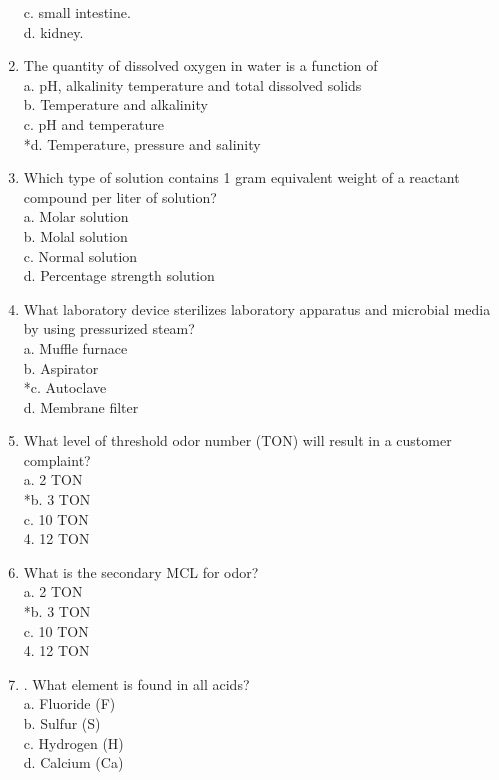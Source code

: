 \begin{enumerate}[1.]
c. small intestine.\\
d. kidney.\\
\item The quantity of dissolved oxygen in water is a function of\\
a.	pH, alkalinity temperature and total dissolved solids\\
b.	Temperature and alkalinity\\
c.	pH and temperature\\
*d.	Temperature, pressure and salinity\\
\item Which type of solution contains 1 gram equivalent weight of a reactant compound per liter of solution?\\
a.	Molar solution\\
b.	Molal solution\\
c.	Normal solution\\
d.	Percentage strength solution\\
\item What laboratory device sterilizes laboratory apparatus and microbial media by using pressurized steam?\\
a.	Muffle furnace\\
b.	Aspirator\\
*c.	Autoclave\\
d.	Membrane filter\\

\item What level of threshold odor number (TON) will result in a customer complaint?\\
a. 2 TON\\
*b. 3 TON\\
c. 10 TON\\
4. 12 TON

\item What is the secondary MCL for odor?\\
a. 2 TON\\
*b. 3 TON\\
c. 10 TON\\
4. 12 TON

\item .  What element is found in all acids?\\
a. Fluoride (F)\\
b. Sulfur (S)\\
c. Hydrogen (H)\\
d. Calcium (Ca)
\end{enumerate}



